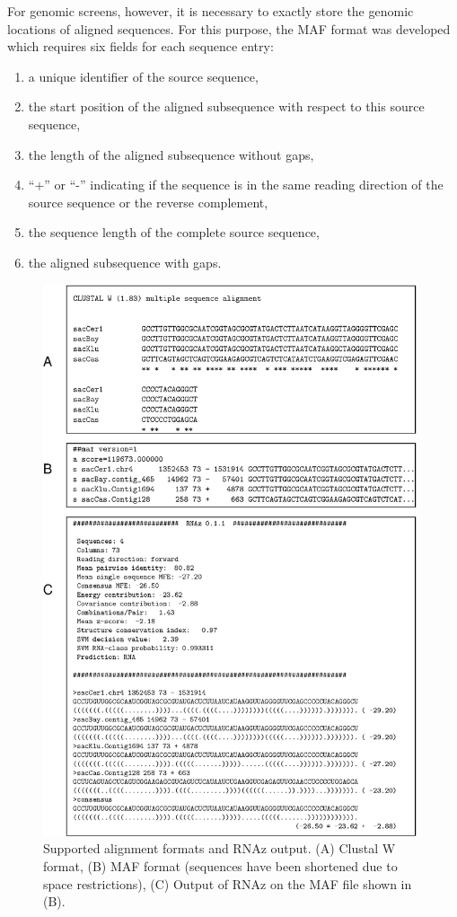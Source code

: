 \documentclass[11pt]{article}
\begin{document}
For genomic screens, however, it is necessary to exactly store the genomic
locations of aligned sequences. For this purpose, the MAF format was
developed which requires six fields for each sequence entry:

\begin{enumerate}

\item a unique identifier of the source sequence,
\item the start position of the aligned subsequence with respect to this
  source sequence,
\item the length of the aligned subsequence without gaps,
\item ``+'' or ``-'' indicating if the sequence is in the same reading
  direction of the source sequence or the reverse complement,
\item the sequence length of the complete source sequence,
\item the aligned subsequence with gaps.

\end{enumerate}


\begin{figure}
\centerline{\includegraphics*[width=11cm]{figs/formats.eps}}
\caption{Supported alignment formats and RNAz output. (A) Clustal W format,
  (B) MAF format (sequences have been shortened due to space restrictions),
  (C) Output of RNAz on the MAF file shown in (B).}
\end{figure}
\end{document}
